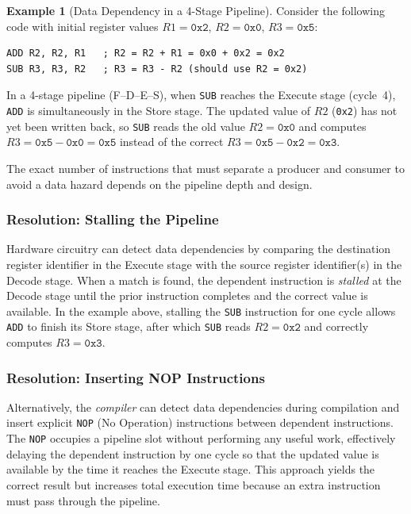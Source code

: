 \documentclass[11pt, a4paper, notitlepage]{report}
\theoremstyle{definition}
\theoremstyle{remark}
\theoremstyle{definition}
\newtheorem{example}[theorem]{Example}
\begin{document}
\begin{example}[Data Dependency in a 4-Stage Pipeline]
\label{ex:data-dependency}
Consider the following code with initial register values $R1 = \texttt{0x2}$, $R2 = \texttt{0x0}$, $R3 = \texttt{0x5}$:
\begin{lstlisting}
ADD R2, R2, R1   ; R2 = R2 + R1 = 0x0 + 0x2 = 0x2
SUB R3, R3, R2   ; R3 = R3 - R2 (should use R2 = 0x2)
\end{lstlisting}
In a 4-stage pipeline (F--D--E--S), when \texttt{SUB} reaches the Execute stage (cycle~4), \texttt{ADD} is simultaneously in the Store stage. The updated value of $R2$ (\texttt{0x2}) has not yet been written back, so \texttt{SUB} reads the old value $R2 = \texttt{0x0}$ and computes $R3 = \texttt{0x5} - \texttt{0x0} = \texttt{0x5}$ instead of the correct $R3 = \texttt{0x5} - \texttt{0x2} = \texttt{0x3}$.
\end{example}

The exact number of instructions that must separate a producer and consumer to avoid a data hazard depends on the pipeline depth and design.

\subsubsection{Resolution: Stalling the Pipeline}
\label{sec:stall}

Hardware circuitry can detect data dependencies by comparing the destination register identifier in the Execute stage with the source register identifier(s) in the Decode stage. When a match is found, the dependent instruction is \emph{stalled} at the Decode stage until the prior instruction completes and the correct value is available. In the example above, stalling the \texttt{SUB} instruction for one cycle allows \texttt{ADD} to finish its Store stage, after which \texttt{SUB} reads $R2 = \texttt{0x2}$ and correctly computes $R3 = \texttt{0x3}$.

\subsubsection{Resolution: Inserting NOP Instructions}
\label{sec:nop}

Alternatively, the \emph{compiler} can detect data dependencies during compilation and insert explicit \texttt{NOP} (No Operation) instructions between dependent instructions. The \texttt{NOP} occupies a pipeline slot without performing any useful work, effectively delaying the dependent instruction by one cycle so that the updated value is available by the time it reaches the Execute stage. This approach yields the correct result but increases total execution time because an extra instruction must pass through the pipeline.
\end{document}
